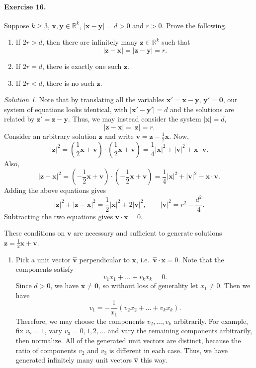 \documentclass[11pt]{report}
\def\R{\mathbb{R}}
\renewcommand\vec\boldsymbol
\def\vx{\vec{x}}
\def\vy{\vec{y}}
\def\vz{\vec{z}}
\theoremstyle{remark}
\newtheorem*{solution}{Solution}
\begin{document}
    \paragraph{Exercise 16.} Suppose $k \geq 3$, $\vx, \vy \in \R^k$,
    $|\vx - \vy| = d > 0$ and $r > 0$. Prove the following.
    \begin{enumerate}
        \itemsep0em
        \item If $2r > d$, then there are infinitely many $\vz \in \R^k$ such
        that \[
            |\vz - \vx| = |\vz - \vy| = r.
        \] 
        \item If $2r = d$, there is exactly one such $\vz$.
        \item If $2r < d$, there is no such $\vz$.
    \end{enumerate}
    \begin{solution}
        Note that by translating all the variables $\vx' = \vx - \vy$,
        $\vy' = \vec{0}$, our system of equations looks identical, with $|\vx' -
        \vy'| = d$ and the solutions are related by $\vz' = \vz -
        \vy$. Thus, we may instead consider the system $|\vx| = d$, \[
            |\vz - \vx| = |\vz| = r.
        \]
        Consider an arbitrary solution $\vz$ and write $\vec{v} = \vz - 
        \frac{1}{2}\vx$. Now, \[
            |\vz|^2 = (\frac{1}{2}\vx + \vec{v})\cdot
            (\frac{1}{2}\vx + \vec{v}) = \frac{1}{4}|\vx|^2 +
            |\vec{v}|^2 + \vx\cdot\vec{v}.
        \] Also, \[
            |\vz - \vx|^2 = 
            (-\frac{1}{2}\vx+\vec{v})\cdot(-\frac{1}{2}\vx+\vec{v}) =
            \frac{1}{4}|\vx|^2 + |\vec{v}|^2 - \vx\cdot\vec{v}. 
        \] Adding the above equations gives \[
            |\vz|^2 + |\vz - \vx|^2 = \frac{1}{2}|\vx|^2 +
            2|\vec{v}|^2, \qquad
            |\vec{v}|^2 = r^2 - \frac{d^2}{4}.
        \] Subtracting the two equations gives $\vec{v}\cdot\vx = 0$.

        These conditions on $\vec{v}$ are necessary and sufficient to generate
        solutions $\vz = \frac{1}{2}\vx + \vec{v}$.

        \begin{enumerate}
            \item Pick a unit vector $\hat{\vec{v}}$ perpendicular to $\vx$,
            i.e.\ $\hat{\vec{v}}\cdot\vx = 0$. Note that the components satisfy
            \[
                v_1x_1 + \dots + v_kx_k = 0.
            \] Since $d > 0$, we have $\vx\neq \vec{0}$, so without loss of generality
            let $x_1 \neq 0$. Then we have \[
                v_1 = -\frac{1}{x_1}(v_2x_2 + \dots + v_kx_k).
            \] Therefore, we may choose the components $v_2, \dots, v_k$
            arbitrarily.  For example, fix $v_2 = 1$, vary $v_3 = 0, 1, 2, \dots$
            and vary the remaining components arbitrarily, then normalize. All of
            the generated unit vectors are distinct, because the ratio of components
            $v_2$ and $v_3$ is different in each case. Thus, we have generated
            infinitely many unit vectors $\hat{\vec{v}}$ this way.


\end{enumerate}
\end{solution}
\end{document}
